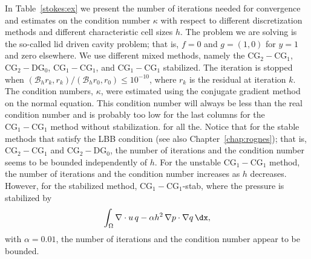 In Table~\ref{stokes:ex} we present the number of iterations needed
for convergence and estimates on the condition number $\kappa$ with
respect to different discretization methods and different
characteristic cell sizes $h$. The problem we are solving is the
so-called lid driven cavity problem; that is, $f=0$ and $g = (1,0)$ for
$y=1$ and zero elsewhere.  We use different mixed methods, namely the
$\mathrm{CG}_2-\mathrm{CG}_1$, $\mathrm{CG}_2-\mathrm{DG}_0$,
$\mathrm{CG}_1-\mathrm{CG}_1$, and $\mathrm{CG}_1-\mathrm{CG}_1$
stabilized.  The iteration is stopped when $(\mathcal{B}_h r_k,
r_k)/(\mathcal{B}_h r_0, r_0) \le 10^{-10}$, where $r_k$ is the
residual at iteration $k$.  The condition numbers, $\kappa$, were
estimated using the conjugate gradient method on the normal
equation. This condition number will always be less than the real
condition number and is probably too low for the last columns for the
$\mathrm{CG}_1-\mathrm{CG}_1$ method without stabilization.  for all
the.  Notice that for the stable methods that satisfy the
LBB condition (see also Chapter~\ref{chap:rognes}); that is,
 $\mathrm{CG}_2-\mathrm{CG}_1$
and $\mathrm{CG}_2-\mathrm{DG}_0$, the number of iterations and the
condition number seems to be bounded independently of $h$. For the
unstable $\mathrm{CG}_1-\mathrm{CG}_1$ method, the number of
iterations and the condition number increases as $h$
decreases. However, for the stabilized method,
$\mathrm{CG}_1-\mathrm{CG}_1$-stab, where the pressure is stabilized
by
\[
\int_\Omega \nabla \cdot u \, q  - \alpha h^2 \, \nabla p \cdot \nabla q \,
    \dx,
\]
with $\alpha=0.01$, the number of iterations and the condition number appear to be bounded.

